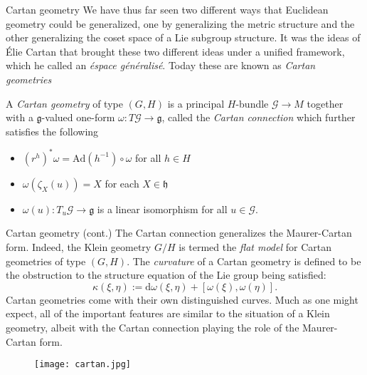 \documentclass[handout]{beamer}
\begin{document}
\begin{frame}{Cartan geometry}
  We have thus far seen two different ways that Euclidean geometry could be generalized, one by generalizing the metric structure and the other generalizing the coset space of a Lie subgroup structure.
  It was the ideas of \'{E}lie Cartan that brought these two different ideas under a unified framework, which he called an \emph{\'{e}space g\'{e}n\'{e}ralis\'{e}}.
  Today these are known as \emph{Cartan geometries}
  \begin{definition}
    A \emph{Cartan geometry} of type $(G,H)$ is a principal $H$-bundle $\mathcal{G} \to M$ together with a $\mathfrak{g}$-valued one-form $\omega : T\mathcal{G} \to \mathfrak{g}$, called the \emph{Cartan connection} which further satisfies the following
    \begin{itemize}
      \item $(r^h)^* \omega = \text{Ad}(h^{-1}) \circ \omega$ for all $h\in H$
      \item $\omega(\zeta_X(u)) = X$ for each $X\in \mathfrak{h}$
      \item $\omega(u) : T_u \mathcal{G} \to \mathfrak{g}$ is a linear isomorphism for all $u\in\mathcal{G}$.
    \end{itemize}
  \end{definition}
\end{frame}

\begin{frame}{Cartan geometry (cont.)}
  The Cartan connection generalizes the Maurer-Cartan form.
  Indeed, the Klein geometry $G/H$ is termed the \emph{flat model} for Cartan geometries of type $(G,H)$.
  The \emph{curvature} of a Cartan geometry is defined to be the obstruction to the structure equation of the Lie group being satisfied:
  \[
    \kappa(\xi, \eta) := \text{d}\omega(\xi, \eta) + [\omega(\xi), \omega(\eta)].
  \]
  Cartan geometries come with their own distinguished curves.
  Much as one might expect, all of the important features are similar to the situation of a Klein geometry, albeit with the Cartan connection playing the role of the Maurer-Cartan form. 
  \begin{figure}
    \texttt{[image: cartan.jpg]}
  \end{figure}
\end{frame}
\end{document}
